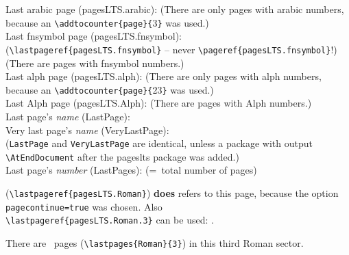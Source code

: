 \documentclass[british]{article}
\def\pagesLTSexampleArabic{3}
\def\pagesLTSexamplealph{23}
\begin{document}
\noindent Last arabic page (pagesLTS.arabic): 
(There are only  pages with arabic numbers,
because an \verb|\addtocounter{page}{|\pagesLTSexampleArabic\verb|}| was used.)\\

\noindent Last fnsymbol page (pagesLTS.fnsymbol):  \\
(\verb|\lastpageref{pagesLTS.fnsymbol}| -- never \verb|\pageref{pagesLTS.fnsymbol}|!)\\
(There are  pages with fnsymbol numbers.)\\

\noindent Last alph page (pagesLTS.alph): 
(There are only  pages with alph numbers,
because an \verb|\addtocounter{page}{|\pagesLTSexamplealph\verb|}| was used.)\\

\noindent Last Alph page (pagesLTS.Alph): 
(There are  pages with Alph numbers.)\\

\noindent Last page's \textit{name} (LastPage): \\

\noindent Very last page's \textit{name} (VeryLastPage): \\
(\texttt{LastPage} and \texttt{VeryLastPage} are identical, unless
a package with output \linebreak
\verb|\AtEndDocument| after the \textsf{pageslts} package was added.)\\

\noindent Last page's \textit{number} (LastPages): 
(=~total number of pages)\\

\lipsum[1-3]

\newpage

(\verb|\lastpageref{pagesLTS.Roman}|)
\textbf{does} refers to this page, because the option
\texttt{pagecontinue=true} was chosen. Also\\
\verb|\lastpageref{pagesLTS.Roman.3}| can be used: .\\

\bigskip

There are ~pages (\verb|\lastpages{Roman}{3}|) in this
third Roman sector.\\
\end{document}
